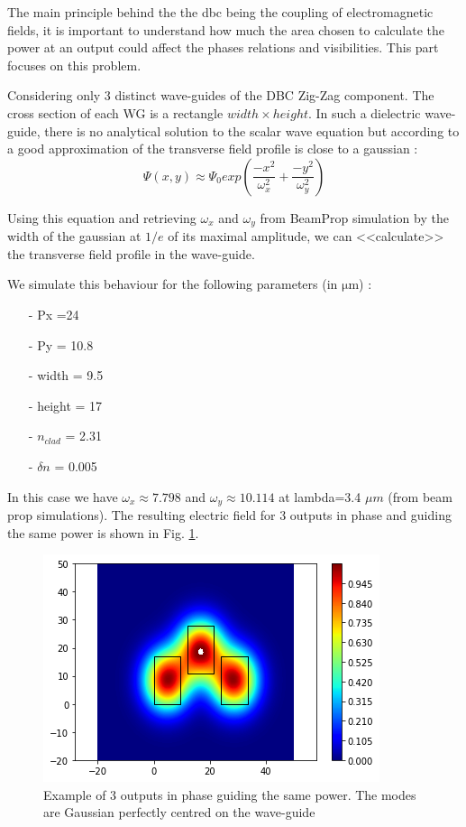 
The main principle behind the the \gls{dbc} being the coupling of electromagnetic fields, it is important to understand how much the area chosen to calculate the power at an output could affect the phases relations and visibilities. This part focuses on this problem.

Considering  only 3 distinct wave-guides of the DBC Zig-Zag component. The cross section of each WG is a rectangle $width \times height$. In such a dielectric wave-guide, there is no analytical solution to the scalar wave equation but according to \cite{labeye} a good approximation of the transverse field profile is close to a gaussian :
$$
\Psi(x,y) \approx \Psi_0 exp\left( \frac{-x^2}{\omega_x^2} + \frac{-y^2}{\omega_y^2}\right)
$$

Using this equation and retrieving $\omega_x$ and $\omega_y$ from BeamProp simulation by the width of the gaussian at $1/e$ of its maximal amplitude, we can <<calculate>> the transverse field profile in the wave-guide.

We simulate this behaviour for the following parameters (in $\si{\micro\meter}$) :
\begin{itemize}
    \setlength\itemsep{0pt}
\item[-] Px =24
\item[-] Py = 10.8
\item[-] width = 9.5
\item[-] height = 17
\item[-] $n_{clad}$ = 2.31
\item[-] $\delta n$ = 0.005
\end{itemize}
In this case we have $\omega_x \approx 7.798$ and $\omega_y \approx
10.114$ at lambda=3.4 $\mu m$ (from beam prop simulations). The resulting electric field for 3 outputs in phase and guiding the same
power is shown in Fig. \ref{fig:3gauss}.

\begin{figure}[htbp]
  \centering
  \includegraphics[scale=.5]{picture/integrating_area/3gauss.png}
  \caption{Example of 3 outputs in phase guiding the same power. The modes are Gaussian perfectly centred on the wave-guide}
  \label{fig:3gauss}
\end{figure}

